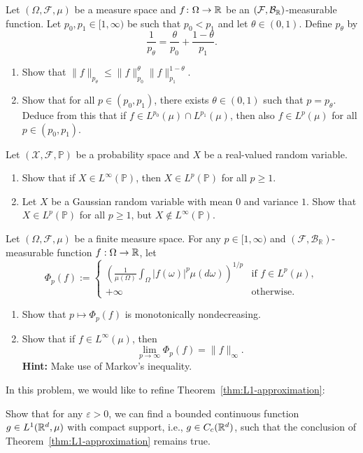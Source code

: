 \begin{problem}
		Let $(\Omega,\mathcal{F},\mu)$ be a measure space and $f\colon\Omega\to\mathbb R$ be an $(\mathcal{F},\mathcal{B}_{\mathbb R})$-measurable function. Let $p_0,p_1\in[1,
		\infty)$ be such that $p_0<p_1$ and let $\theta\in(0,1)$. Define $p_\theta$ by
		\[
			\frac{1}{p_\theta} = \frac{\theta}{p_0} + \frac{1-\theta}{p_1}.
		\]
		\begin{enumerate}[label={(\alph*)}]
			\item Show that $\|f\|_{p_\theta}\le \|f\|_{p_0}^\theta\|f\|_{p_1}^{1-\theta}$.
			\item Show that for all $p\in(p_0,p_1)$, there exists $\theta\in(0,1)$ such that $p=p_\theta$. Deduce from this that if $f\in L^{p_0}(\mu)\cap L^{p_1}(\mu)$, then also $f\in L^p(\mu)$ for all $p\in(p_0,p_1)$.
		\end{enumerate}
\end{problem}

\begin{problem}
Let $(\mathcal{X},\mathcal{F},\mathbb{P})$ be a probability space and $X$ be a real-valued random variable.
	\begin{enumerate}[label={(\alph*)}]
		\item Show that if $X\in L^\infty(\mathbb{P})$, then $X\in L^p(\mathbb{P})$ for all $p\ge 1$.
		\item Let $X$ be a Gaussian random variable with mean $0$ and variance $1$. Show that $X\in L^p(\mathbb{P})$ for all $p\ge 1$, but $X\notin L^\infty(\mathbb{P})$.
	\end{enumerate}
\end{problem}

\begin{problem}
	Let $(\Omega,\mathcal{F},\mu)$ be a finite measure space. For any $p\in[1,\infty)$ and $(\mathcal{F},\mathcal{B}_\mathbb{R})$-measurable function $f:\Omega\to\mathbb R$, let 
	\[
		\Phi_p(f) := \begin{cases}\displaystyle
			\left(\frac{1}{\mu(\Omega)}\int_\Omega |f(\omega)|^p \mu(d\omega)\right)^{1/p} &\text{if $f\in L^p(\mu)$},\\
			+\infty &\text{otherwise}.
		\end{cases}
	\]
	\begin{enumerate}[label={(\alph*)}]
		\item Show that $p\mapsto \Phi_p(f)$ is monotonically nondecreasing.
		\item Show that if $f\in L^\infty(\mu)$, then
		\[
			\lim_{p\to\infty} \Phi_p(f) = \|f\|_\infty.
		\]
			\textbf{Hint:} Make use of Markov's inequality.
	\end{enumerate}
\end{problem}

\begin{problem}
	In this problem, we would like to refine Theorem~\ref{thm:L1-approximation}:
	
	Show that for any $\varepsilon>0$, we can find a bounded continuous function $g\in L^1(\mathbb R^d,\mu)$ with compact support, i.e., $g\in C_c(\mathbb R^d)$, such that the conclusion of Theorem~\ref{thm:L1-approximation} remains true.
\end{problem}




